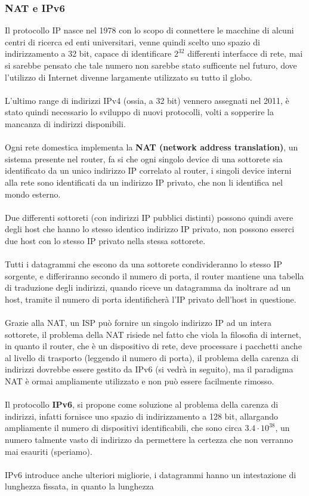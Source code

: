 \documentclass[12pt, letterpaper]{article}
\newcommand{\acc}{\\\hphantom{}\\}
\begin{document}
\subsubsection{NAT e IPv6}
Il protocollo IP nasce nel 1978 con lo scopo di connettere le macchine di alcuni centri di ricerca ed enti universitari, 
venne quindi scelto uno spazio di indirizzamento a 32 bit, capace di identificare $2^{32}$ differenti interfacce di rete, mai si 
sarebbe pensato che tale numero non sarebbe stato sufficente nel futuro, dove l'utilizzo di Internet divenne largamente utilizzato 
su tutto il globo.\acc 
L'ultimo range di indirizzi IPv4 (ossia, a 32 bit) vennero assegnati nel 2011, è stato quindi necessario lo sviluppo di nuovi 
protocolli, volti a sopperire la mancanza di indirizzi disponibili.\acc 
Ogni rete domestica implementa la \textbf{NAT (network address translation)}, un sistema presente nel router, fa si che ogni 
singolo device di una sottorete sia identificato da un unico indirizzo IP correlato al router, i singoli device 
interni alla rete sono identificati da un indirizzo IP privato, che non li identifica nel mondo esterno.\acc 
Due differenti sottoreti (con indirizzi IP pubblici distinti) possono quindi avere degli host che hanno lo stesso 
identico indirizzo IP privato, non possono esserci due host con lo stesso IP privato nella stessa sottorete.\acc 
Tutti i datagrammi che escono da una sottorete condivideranno lo stesso IP sorgente, e differiranno secondo il numero 
di porta, il router mantiene una tabella di traduzione degli indirizzi, quando riceve un datagramma da inoltrare 
ad un host, tramite il numero di porta identificherà l'IP privato dell'host in questione.\acc Grazie 
alla NAT, un ISP può fornire un singolo indirizzo IP ad un intera sottorete, il problema della NAT risiede nel fatto che 
viola la filosofia di internet, in quanto il router, che è un dispositivo di rete, deve processare i pacchetti anche 
al livello di trasporto (leggendo il numero di porta), il problema della carenza di indirizzi dovrebbe essere 
gestito da IPv6 (si vedrà in seguito), ma il paradigma NAT è ormai ampliamente utilizzato e non può essere 
facilmente rimosso.\acc 
Il protocollo \textbf{IPv6}, si propone come soluzione al problema della carenza di indirizzi, infatti fornisce uno  
spazio di indirizzamento a 128 bit, allargando ampliamente il numero di dispositivi identificabili, che sono circa $3.4\cdot 10^{38}$, 
un numero talmente vasto di indirizzo da permettere la certezza che non verranno mai esauriti (speriamo).\acc 
IPv6 introduce anche ulteriori migliorie, i datagrammi hanno un intestazione di lunghezza fissata, in quanto la lunghezza 
\end{document}
